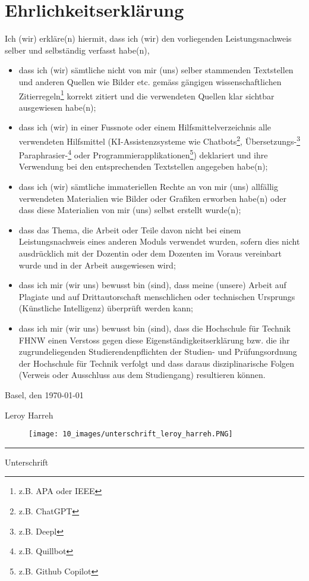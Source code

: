 \documentclass[a4paper,10pt]{scrartcl}
\begin{document}
    \section{Ehrlichkeitserklärung}
Ich (wir) erkläre(n) hiermit, dass ich (wir) den vorliegenden Leistungsnachweis selber und selbständig verfasst habe(n),
\begin{itemize} 
\item dass ich (wir) sämtliche nicht von mir (uns) selber stammenden Textstellen und anderen Quellen wie Bilder etc. gemäss gängigen wissenschaftlichen Zitierregeln\footnote{z.B. APA oder IEEE} korrekt zitiert und die verwendeten Quellen klar sichtbar ausgewiesen habe(n); 
\item dass ich (wir) in einer Fussnote oder einem Hilfsmittelverzeichnis alle verwendeten Hilfsmittel (KI-Assistenzsysteme wie Chatbots\footnote{z.B. ChatGPT}, Übersetzungs-\footnote{z.B. Deepl} Paraphrasier-\footnote{z.B. Quillbot} oder Programmierapplikationen\footnote{z.B. Github Copilot}) deklariert und ihre Verwendung bei den entsprechenden Textstellen angegeben habe(n);
\item dass ich (wir) sämtliche immateriellen Rechte an von mir (uns) allfällig verwendeten Materialien wie Bilder oder Grafiken erworben habe(n) oder dass diese Materialien von mir (uns) selbst erstellt wurde(n);
\item dass das Thema, die Arbeit oder Teile davon nicht bei einem Leistungsnachweis eines anderen Moduls verwendet wurden, sofern dies nicht ausdrücklich mit der Dozentin oder dem Dozenten im Voraus vereinbart wurde und in der Arbeit ausgewiesen wird; 
\item dass ich mir (wir uns) bewusst bin (sind), dass meine (unsere) Arbeit auf Plagiate und auf Drittautorschaft menschlichen oder technischen Ursprungs (Künstliche Intelligenz) überprüft werden kann;
\item dass ich mir (wir uns) bewusst bin (sind), dass die Hochschule für Technik FHNW einen Verstoss gegen diese Eigenständigkeitserklärung bzw. die ihr zugrundeliegenden Studierendenpflichten der Studien- und Prüfungsordnung der Hochschule für Technik verfolgt und dass daraus disziplinarische Folgen (Verweis oder Ausschluss aus dem Studiengang) resultieren können.
\end{itemize}	\vspace{1cm}
	   Basel, den \today\\
	\vspace{1cm}
    	\begin{minipage}[t]{0.4\linewidth}
    		\textsf{Leroy Harreh}
    	   \begin{figure}[H]
                \texttt{[image: 10\_images/unterschrift\_leroy\_harreh.PNG]}
            \end{figure}
    		\rule{6cm}{1px}
    		{\scriptsize  \hspace{2.7cm} Unterschrift}
    	\end{minipage}
\end{document}
